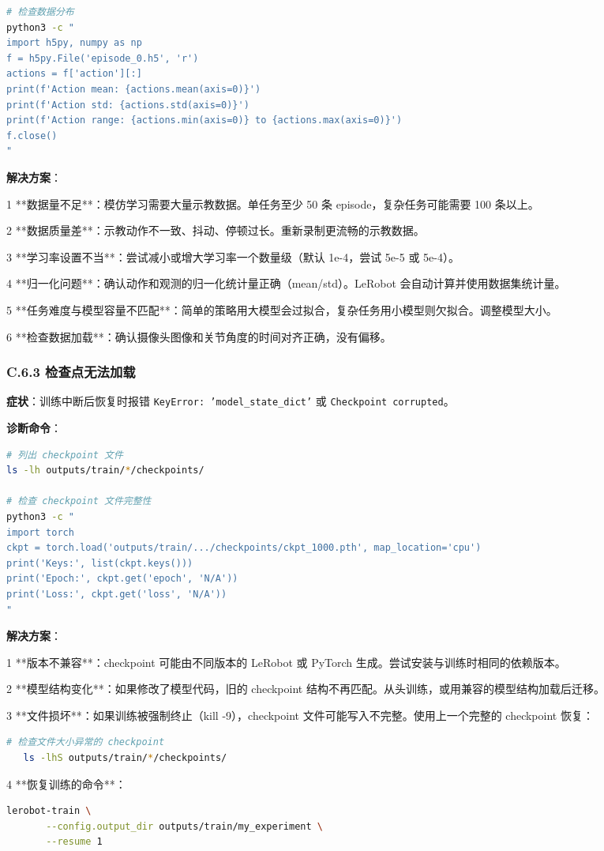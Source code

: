 \documentclass[UTF8,a4paper,11pt]{ctexart}
\begin{document}
{\begin{lstlisting}[language=bash]
# 检查数据分布
python3 -c "
import h5py, numpy as np
f = h5py.File('episode_0.h5', 'r')
actions = f['action'][:]
print(f'Action mean: {actions.mean(axis=0)}')
print(f'Action std: {actions.std(axis=0)}')
print(f'Action range: {actions.min(axis=0)} to {actions.max(axis=0)}')
f.close()
"
\end{lstlisting}

\textbf{解决方案}：
\item[1] **数据量不足**：模仿学习需要大量示教数据。单任务至少 50 条 episode，复杂任务可能需要 100 条以上。
\item[2] **数据质量差**：示教动作不一致、抖动、停顿过长。重新录制更流畅的示教数据。
\item[3] **学习率设置不当**：尝试减小或增大学习率一个数量级（默认 1e-4，尝试 5e-5 或 5e-4）。
\item[4] **归一化问题**：确认动作和观测的归一化统计量正确（mean/std）。LeRobot 会自动计算并使用数据集统计量。
\item[5] **任务难度与模型容量不匹配**：简单的策略用大模型会过拟合，复杂任务用小模型则欠拟合。调整模型大小。
\item[6] **检查数据加载**：确认摄像头图像和关节角度的时间对齐正确，没有偏移。

\subsubsection{C.6.3 检查点无法加载}

\textbf{症状}：训练中断后恢复时报错 \texttt{KeyError: 'model_state_dict'} 或 \texttt{Checkpoint corrupted}。

\textbf{诊断命令}：
\begin{lstlisting}[language=bash]
# 列出 checkpoint 文件
ls -lh outputs/train/*/checkpoints/

# 检查 checkpoint 文件完整性
python3 -c "
import torch
ckpt = torch.load('outputs/train/.../checkpoints/ckpt_1000.pth', map_location='cpu')
print('Keys:', list(ckpt.keys()))
print('Epoch:', ckpt.get('epoch', 'N/A'))
print('Loss:', ckpt.get('loss', 'N/A'))
"
\end{lstlisting}

\textbf{解决方案}：
\item[1] **版本不兼容**：checkpoint 可能由不同版本的 LeRobot 或 PyTorch 生成。尝试安装与训练时相同的依赖版本。
\item[2] **模型结构变化**：如果修改了模型代码，旧的 checkpoint 结构不再匹配。从头训练，或用兼容的模型结构加载后迁移。
\item[3] **文件损坏**：如果训练被强制终止（kill -9），checkpoint 文件可能写入不完整。使用上一个完整的 checkpoint 恢复：
\begin{lstlisting}[language=bash]
   # 检查文件大小异常的 checkpoint
   ls -lhS outputs/train/*/checkpoints/
\end{lstlisting}
\item[4] **恢复训练的命令**：
\begin{lstlisting}[language=bash]
   lerobot-train \
       --config.output_dir outputs/train/my_experiment \
       --resume 1
\end{lstlisting}

}
\end{document}
